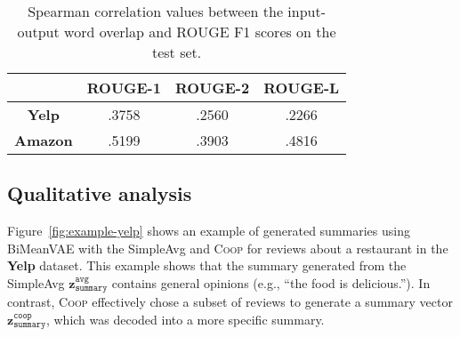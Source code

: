 \documentclass[11pt]{article}
\newcommand{\aggname}{\textsc{Coop}}
\newcommand{\scorename}{input-output word overlap}
\newcommand{\name}{\mbox{\sc BiMeanVAE}}
\newcommand{\yelp}{\mbox{\bf Yelp}}
\newcommand{\amazon}{\mbox{\bf Amazon}}
\newcommand{\hl}[1]{#1}
\begin{document}
\begin{table}[t]
    \centering
    \small
    \begin{tabular}{c|ccc}
    \toprule
      & ROUGE-1 & ROUGE-2 & ROUGE-L \\\midrule
      \yelp & .3758 & .2560 & .2266 \\
      \amazon & .5199 & .3903 & .4816 \\ \bottomrule
    \end{tabular}
    \caption{\hl{Spearman correlation values between the \scorename{} and ROUGE F1 scores on the test set.}}\label{tab:correlation}
\end{table}

\subsection{Qualitative analysis} \label{sec:exp:examples}
Figure~\ref{fig:example-yelp} shows an example of generated summaries using \name{} with the SimpleAvg and \aggname{} for reviews about a restaurant in the \yelp{} dataset.
This example shows that the summary generated from the SimpleAvg $\boldsymbol{z}_{\texttt{summary}}^{\texttt{avg}}$ contains general opinions (e.g., ``the food is delicious.'').
In contrast, \aggname{} effectively chose a subset of reviews to generate a summary vector $\boldsymbol{z}_{\texttt{summary}}^{\texttt{coop}}$, which was decoded into a more specific summary.
\end{document}
